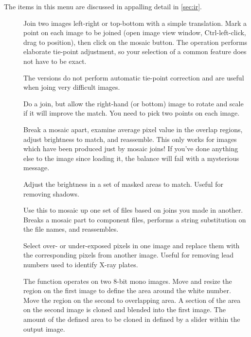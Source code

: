 The items in this menu are discussed in appalling detail in
\cref{sec:ir}.

\begin{description}

\item[]
	Join two images left-right or top-bottom with a simple
	translation. Mark a point on each image to be joined (open image
	view window, Ctrl-left-click, drag to position), then click on the
	mosaic button. The
	operation performs elaborate tie-point adjustment, so your selection
	of a common feature does not have to be exact.

	The  versions do not perform automatic tie-point correction
	and are useful when joing very difficult images.

\item[]
	Do a join, but allow the right-hand (or bottom) image to rotate and
	scale if it will improve the match. You need to pick two points on
	each image.

\item[]
	Break a mosaic apart, examine average pixel value in the overlap
	regions, adjust brightness to match, and reassemble. This only works
	for images which have been produced just by mosaic joins! If you've
	done anything else to the image since loading it, the balance will
	fail with a mysterious message.

\item[]
	Adjust the brightness in a set of masked areas to match. Useful for
	removing shadows.

\item[]
	Use this to mosaic up one set of files based on joins you made
	in another.  Breaks a mosaic part to component files, performs a
	string substitution on the file names, and reassembles. 

\item[]
	Select over- or under-exposed pixels in one image and replace them
	with the corresponding pixels from another image. Useful for removing
	lead numbers used to identify X-ray plates.

	The function
	operates on two 8-bit mono images.  Move and resize the region
	on the first image to define the area around the white number.
	Move the region on the second to overlapping area.  A section of the
	area on the second image is cloned and blended into the first image.
	The amount of the defined area to be cloned in defined by a slider
	within the output image.

\end{description}

